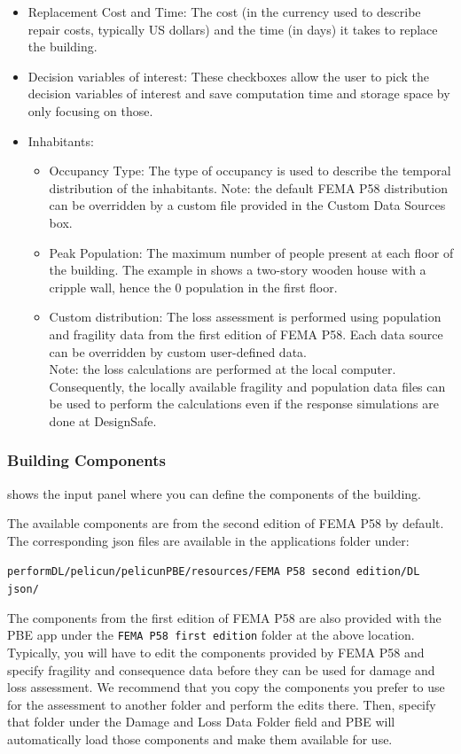 \begin{itemize}
	\item Replacement Cost and Time: The cost (in the currency used to describe repair costs, typically US dollars) and the time (in days) it takes to replace the building.
	\item Decision variables of interest: These checkboxes allow the user to pick the decision variables of interest and save computation time and storage space by only focusing on those.
	\item Inhabitants:
	\begin{itemize}
		\item Occupancy Type: The type of occupancy is used to describe the temporal distribution of the inhabitants. Note: the default FEMA P58 distribution can be overridden by a custom file provided in the Custom Data Sources box.
		\item Peak Population: The maximum number of people present at each floor of the building. The example in  shows a two-story wooden house with a cripple wall, hence the 0 population in the first floor.
		\item Custom distribution: The loss assessment is performed using population and fragility data from the first edition of FEMA P58. Each data source can be overridden by custom user-defined data.\\
		Note: the loss calculations are performed at the local computer. Consequently, the locally available fragility and population data files can be used to perform the calculations even if the response simulations are done at DesignSafe.
	\end{itemize}
\end{itemize}

\subsubsection{Building Components}

 shows the input panel where you can define the components of the building. 

The available components are from the second edition of FEMA P58 by default. The corresponding json files are available in the applications folder under: 

\texttt{performDL/pelicun/pelicunPBE/resources/FEMA P58 second edition/DL json/} 

The components from the first edition of FEMA P58 are also provided with the PBE app  under the \texttt{FEMA P58 first edition} folder at the above location. Typically, you will have to edit the components provided by FEMA P58 and specify fragility and consequence data before they can be used for damage and loss assessment. We recommend that you copy the components you prefer to use for the assessment to another folder and perform the edits there. Then, specify that folder under the Damage and Loss Data Folder field and PBE will automatically load those components and make them available for use.

